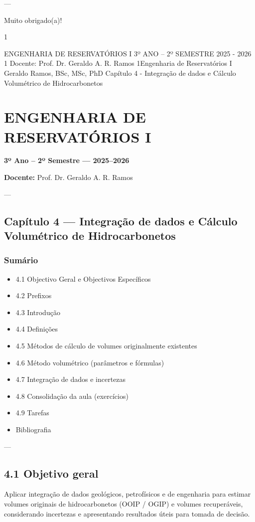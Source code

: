 \documentclass[11pt,a4paper]{article}
\begin{document}
---

Muito obrigado(a)!




1



ENGENHARIA DE RESERVATÓRIOS I
3º ANO – 2º SEMESTRE
2025 - 2026
1
Docente: Prof. Dr. Geraldo A. R. Ramos
1Engenharia de Reservatórios I
Geraldo Ramos, BSc, MSc, PhD
Capítulo 4 - Integração de dados e Cálculo Volumétrico de Hidrocarbonetos
\section{ENGENHARIA DE RESERVATÓRIOS I}
 \textbf{3º Ano – 2º Semestre — 2025–2026}

 \textbf{Docente:} Prof. Dr. Geraldo A. R. Ramos

 ---

\subsection{Capítulo 4 — Integração de dados e Cálculo Volumétrico de Hidrocarbonetos}

\subsubsection{Sumário}
\begin{itemize}
\item 4.1 Objectivo Geral e Objectivos Específicos
\item 4.2 Prefixos
\item 4.3 Introdução
\item 4.4 Definições
\item 4.5 Métodos de cálculo de volumes originalmente existentes
\item 4.6 Método volumétrico (parâmetros e fórmulas)
\item 4.7 Integração de dados e incertezas
\item 4.8 Consolidação da aula (exercícios)
\item 4.9 Tarefas
\item Bibliografia
\end{itemize}

 ---

\subsection{4.1 Objetivo geral}
Aplicar integração de dados geológicos, petrofísicos e de engenharia para estimar volumes originais de hidrocarbonetos (OOIP / OGIP) e volumes recuperáveis, considerando incertezas e apresentando resultados úteis para tomada de decisão.
\end{document}
